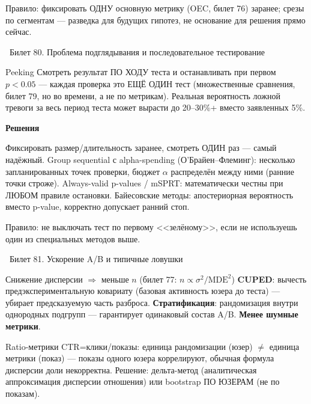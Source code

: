 \documentclass[12pt, a4paper]{article}
\newcommand{\bilet}[2]{%
  \vspace{10pt}%
  \noindent\colorbox{qcolor}{\parbox{\dimexpr\linewidth-2\fboxsep\relax}{%
    \color{white}\large\bfseries\strut\ Билет #1. #2%
  }}%
  \nopagebreak\vspace{5pt}\par\nopagebreak%
}
\newcommand{\qsub}[1]{%
  \vspace{5pt}%
  {\bfseries\color{defblue} #1}%
  \par\vspace{2pt}%
}
\begin{document}
\begin{fishkabox}
Правило: фиксировать ОДНУ основную метрику (OEC, билет 76) заранее; срезы по сегментам --- разведка для будущих гипотез, не основание для решения прямо сейчас.
\end{fishkabox}

\bilet{80}{Проблема подглядывания и последовательное тестирование}

\begin{defbox}{Peeking}
Смотреть результат ПО ХОДУ теста и останавливать при первом $p{<}0.05$ --- каждая проверка это ЕЩЁ ОДИН тест (множественные сравнения, билет 79, но во времени, а не по метрикам). Реальная вероятность ложной тревоги за весь период теста может вырасти до 20--30\%+ вместо заявленных 5\%.
\end{defbox}

\qsub{Решения}
Фиксировать размер/длительность заранее, смотреть ОДИН раз --- самый надёжный. Group sequential с alpha-spending (О'Брайен--Флеминг): несколько запланированных точек проверки, бюджет $\alpha$ распределён между ними (ранние точки строже). Always-valid p-values / mSPRT: математически честны при ЛЮБОМ правиле остановки. Байесовские методы: апостериорная вероятность вместо p-value, корректно допускает ранний стоп.

\begin{fishkabox}
Правило: не выключать тест по первому <<зелёному>>, если не используешь один из специальных методов выше.
\end{fishkabox}

\bilet{81}{Ускорение A/B и типичные ловушки}

\begin{defbox}{Снижение дисперсии $\Rightarrow$ меньше $n$ (билет 77: $n\propto\sigma^2/\text{MDE}^2$)}
\textbf{CUPED}: вычесть предэкспериментальную ковариату (базовая активность юзера до теста) --- убирает предсказуемую часть разброса. \textbf{Стратификация}: рандомизация внутри однородных подгрупп --- гарантирует одинаковый состав A/B. \textbf{Менее шумные метрики}.
\end{defbox}

\begin{propbox}{Ratio-метрики}
CTR=клики/показы: единица рандомизации (юзер) $\ne$ единица метрики (показ) --- показы одного юзера коррелируют, обычная формула дисперсии доли некорректна. Решение: дельта-метод (аналитическая аппроксимация дисперсии отношения) или bootstrap ПО ЮЗЕРАМ (не по показам).
\end{propbox}
\end{document}

